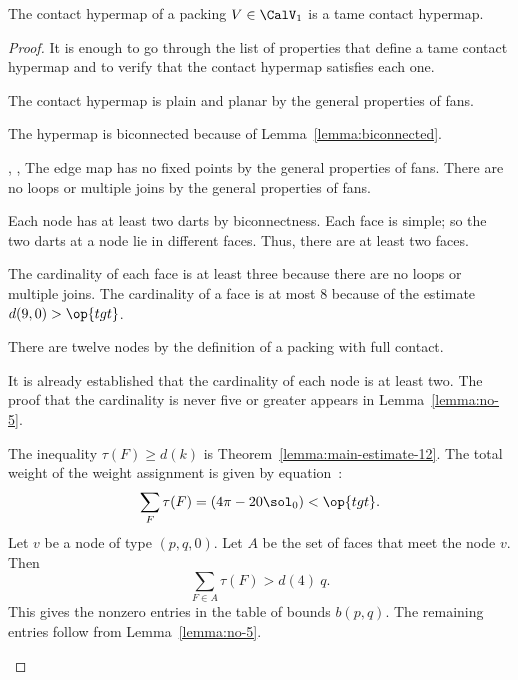
\begin{theorem} The contact hypermap of a 
  packing $V\in \CalV_1$  is a tame contact hypermap.
\end{theorem}
%
%
%
%

\begin{proof} It is enough to go through the list of properties that
  define a tame contact hypermap and to verify that the contact
  hypermap satisfies each one.  

\begin{nomerate}
\item {} The contact hypermap is plain and planar by the
  general properties of fans.
\item {} The hypermap is biconnected because of
  Lemma~\ref{lemma:biconnected}. 
\item {}, ,  The
  edge map has no fixed points by the general properties of fans.
  There are no loops or multiple joins by the general properties of
  fans.
\item {} Each node has at least two darts by
  biconnectness. Each face is simple; so the two darts at a node lie
  in different faces.  Thus, there are at least two faces.
\item {} The cardinality of each face is at least three
  because there are no loops or multiple joins.  The cardinality of a
  face is at most $8$ because of the estimate $d(9,0)>\op{tgt}$.
\item {} There are twelve nodes by the definition of a
   packing with full contact.
\item {} It is already established that the cardinality
  of each node is at least two.  The proof that the cardinality is
  never five or greater appears in Lemma~\ref{lemma:no-5}.
\item {} The inequality $\tau(F)\ge d(k)$ is
  Theorem~\ref{lemma:main-estimate-12}.
  The total weight of the weight assignment is given by
  equation~:
\begin{displaymath}
\sum_F \tau(F) = (4\pi - 20\sol_0) < \op{tgt}.
\end{displaymath}
%
Let $v$ be a node of type $(p,q,0)$.  Let $A$ be the set of faces that
meet the node $v$. Then
\begin{displaymath}
\sum_{F\in A}\tau(F) > d(4)~q.
\end{displaymath}
This gives the nonzero entries in the table of bounds $b(p,q)$.  The
remaining entries follow from Lemma~\ref{lemma:no-5}.
\end{nomerate}
\end{proof}




